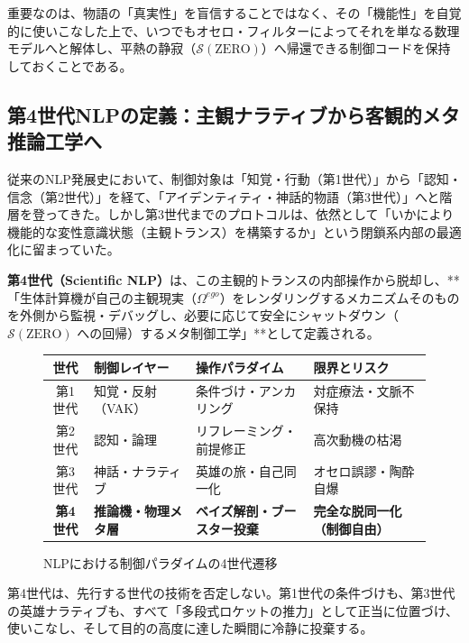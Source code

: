 重要なのは、物語の「真実性」を盲信することではなく、その「機能性」を自覚的に使いこなした上で、いつでもオセロ・フィルターによってそれを単なる数理モデルへと解体し、平熱の静寂（$\mathcal{S}(\text{ZERO})$）へ帰還できる制御コードを保持しておくことである。


\subsection{第4世代NLPの定義：主観ナラティブから客観的メタ推論工学へ}
\label{sec:fourth_generation_nlp}

従来のNLP発展史において、制御対象は「知覚・行動（第1世代）」から「認知・信念（第2世代）」を経て、「アイデンティティ・神話的物語（第3世代）」へと階層を登ってきた。しかし第3世代までのプロトコルは、依然として「いかにより機能的な変性意識状態（主観トランス）を構築するか」という閉鎖系内部の最適化に留まっていた。

\textbf{第4世代（Scientific NLP）}は、この主観的トランスの内部操作から脱却し、**「生体計算機が自己の主観現実（$\Omega^{ego}$）をレンダリングするメカニズムそのものを外側から監視・デバッグし、必要に応じて安全にシャットダウン（$\mathcal{S}(\text{ZERO})$ への回帰）するメタ制御工学」**として定義される。

\begin{figure}[htbp]
\centering
\begin{tabular}{clll}
\hline
\textbf{世代} & \textbf{制御レイヤー} & \textbf{操作パラダイム} & \textbf{限界とリスク} \\ \hline
第1世代 & 知覚・反射（VAK） & 条件づけ・アンカリング & 対症療法・文脈不保持 \\
第2世代 & 認知・論理 & リフレーミング・前提修正 & 高次動機の枯渇 \\
第3世代 & 神話・ナラティブ & 英雄の旅・自己同一化 & オセロ誤謬・陶酔自爆 \\ \hline
\textbf{第4世代} & \textbf{推論機・物理メタ層} & \textbf{ベイズ解剖・ブースター投棄} & \textbf{完全な脱同一化（制御自由）} \\ \hline
\end{tabular}
\caption{NLPにおける制御パラダイムの4世代遷移}
\label{tab:nlp_generations}
\end{figure}

第4世代は、先行する世代の技術を否定しない。第1世代の条件づけも、第3世代の英雄ナラティブも、すべて「多段式ロケットの推力」として正当に位置づけ、使いこなし、そして目的の高度に達した瞬間に冷静に投棄する。

